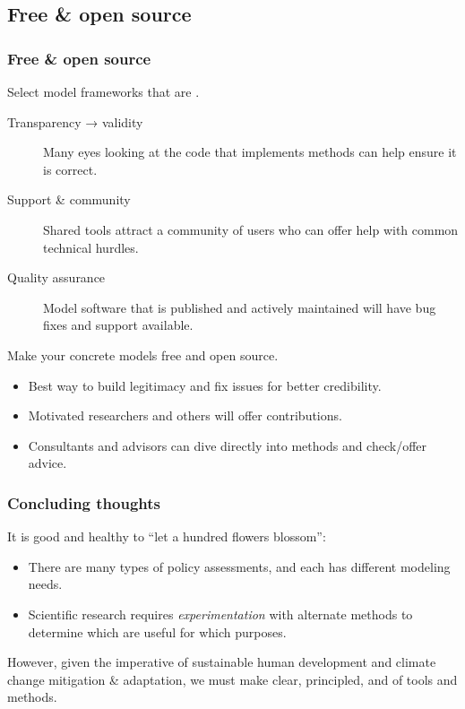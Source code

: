 \documentclass[12pt,aspectratio=169]{beamer}
\begin{document}
\subsection{Free \& open source}
\begin{frame}
\frametitle{Free \& open source}

Select model frameworks that are .

\begin{description}
  \item [Transparency → validity] Many eyes looking at the code that implements methods can help ensure it is correct.
  \item [Support \& community] Shared tools attract a community of users who can offer help with common technical hurdles.
  \item [Quality assurance] Model software that is published and actively maintained will have bug fixes and support available.
\end{description}

\bigskip
Make your concrete models free and open source.
\begin{itemize}
  \item Best way to build legitimacy and fix issues for better credibility.
  \item Motivated researchers and others will offer contributions.
  \item Consultants and advisors can dive directly into methods and check/offer advice.
\end{itemize}

\end{frame}

\begin{frame}
\frametitle{Concluding thoughts}

It is good and healthy to “let a hundred flowers blossom”:
\begin{itemize}
  \item There are many types of policy assessments, and each has different modeling needs.
  \item Scientific research requires \emph{experimentation} with alternate methods to determine which are useful for which purposes.
\end{itemize}

\bigskip
However, given the imperative of sustainable human development and climate change mitigation \& adaptation, we must make clear, principled, and  of tools and methods.
\end{frame}
\end{document}
